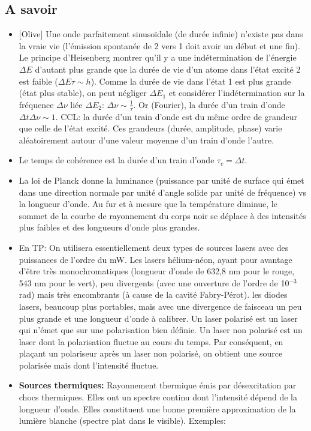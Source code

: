 \documentclass[11pt]{report}
\numberwithin{figure}{section}
\numberwithin{equation}{section}
\numberwithin{table}{section}
\newcommand{\1}{\boldsymbol{1}}
\begin{document}
\subsection*{A savoir}
\begin{itemize}
\item {[Olive]} Une onde parfaitement sinusoïdale (de durée infinie) n'existe pas dans la vraie vie (l'émission spontanée de 2 vers 1 doit avoir un début et une fin). Le principe d'Heisenberg montrer qu'il y a une indétermination de l'énergie $\Delta E$ d'autant plus grande que la durée de vie d'un atome dans l'état excité 2 est faible ($\Delta E \tau \sim h$). Comme la durée de vie dans l'état 1 est plus grande (état plus stable), on peut négliger $\Delta E_1$ et considérer l'indétermination sur la fréquence $\Delta \nu$ liée $\Delta E_2$: $\Delta \nu \sim \frac{1}{\tau}$. Or (Fourier), la durée d'un train d'onde $\Delta t \Delta \nu \sim 1$. CCL: la durée d'un train d'onde est du même ordre de grandeur que celle de l'état excité. Ces grandeurs (durée, amplitude, phase) varie aléatoirement autour d'une valeur moyenne d'un train d'onde l'autre.
\item Le temps de cohérence est la durée d'un train d'onde $\tau_c = \Delta t$.
\item La loi de Planck donne la luminance (puissance par unité de surface qui émet dans une direction normale par unité d'angle solide par unité de fréquence) vs la longueur d'onde. Au fur et à mesure que la température diminue, le sommet de la courbe de rayonnement du corps noir se déplace à des intensités plus faibles et des longueurs d'onde plus grandes.  
\item En TP: On utilisera essentiellement deux types de sources lasers avec des puissances de l’ordre du mW. Les lasers hélium-néon, ayant pour avantage d’être très monochromatiques (longueur d’onde de 632,8 nm pour le rouge, 543 nm pour le vert), peu divergents (avec une ouverture de l’ordre de 10$^{-3}$ rad) mais très encombrants (à cause de la cavité Fabry-Pérot). les diodes lasers, beaucoup plus portables, mais avec une divergence de faisceau un peu plus grande et une longueur d’onde à calibrer. Un laser polarisé est un laser qui n’émet que sur une polarisation bien définie. Un laser non polarisé est un laser dont la polarisation fluctue au cours du temps. Par conséquent, en plaçant un polariseur après un laser non polarisé, on obtient une source polarisée mais dont l’intensité fluctue.
\item \textbf{Sources thermiques:} Rayonnement thermique émis par désexcitation par chocs thermiques. Elles ont un spectre continu dont l’intensité dépend de la longueur d’onde. Elles constituent une bonne première approximation de la lumière blanche (spectre plat dans le visible). Exemples:

\end{itemize}
\end{document}
